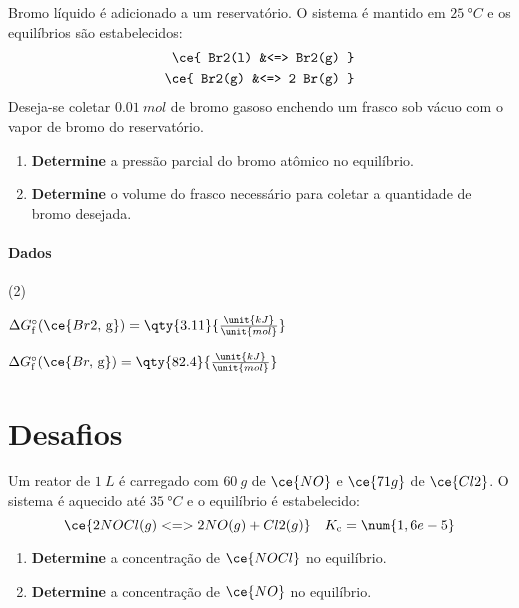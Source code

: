 \begin{problem}[
	id={2F68},
	path={/home/braun/Documents/Developer/braunchem/data/problems/Q2/2F/2F68}
]
Bromo líquido é adicionado a um reservatório. O sistema é mantido em {\(\qty{25}{\unit{\degree C}}\)} e os equilíbrios são estabelecidos: {\[
\begin{aligned}
    \ce{ Br2(l) &<=> Br2(g) } \\
    \ce{ Br2(g) &<=> 2 Br(g) }
\end{aligned}
\]} Deseja-se coletar {\(\qty{0,01}{\unit{mol}}\)} de bromo gasoso enchendo um frasco sob vácuo com o vapor de bromo do reservatório.

\begin{enumerate}
\def\labelenumi{\alph{enumi}.}
\tightlist
\item
  \textbf{Determine} a pressão parcial do bromo atômico no equilíbrio.
\item
  \textbf{Determine} o volume do frasco necessário para coletar a quantidade de bromo desejada.
\end{enumerate}
\paragraph{Dados}\small 
\begin{datalist}
[start = 1](2)\item $\Delta G_\mathrm{f}^{\circ}(\ce{Br2,\,\text{g}}) = \qty{3.11}{\tfrac{\unit{kJ}}{\unit{mol}}}$
\item $\Delta G_\mathrm{f}^{\circ}(\ce{Br,\,\text{g}}) = \qty{82.4}{\tfrac{\unit{kJ}}{\unit{mol}}}$
\end{datalist}

\end{problem}

\section*{Desafios}

\begin{problem}[
	id={2F69},
	path={/home/braun/Documents/Developer/braunchem/data/problems/Q2/2F/2F69}
]
Um reator de {\(\qty{1}{\unit{L}}\)} é carregado com {\(\qty{60}{\unit{g}}\)} de {\(\ce{NO}\)} e {\(\ce{71 g}\)} de {\(\ce{Cl2}\)}. O sistema é
aquecido até {\(\qty{35}{\unit{\degree C}}\)} e o equilíbrio é estabelecido: {\[
    \ce{ 2 NOCl(g) <=> 2 NO(g) + Cl2(g) } \quad K_\mathrm{c} =
\num{1,6e-5}
\]}

\begin{enumerate}
\def\labelenumi{\alph{enumi}.}
\tightlist
\item
  \textbf{Determine} a concentração de {\(\ce{NOCl}\)} no equilíbrio.
\item
  \textbf{Determine} a concentração de {\(\ce{NO}\)} no equilíbrio.
\end{enumerate}

\end{problem}


